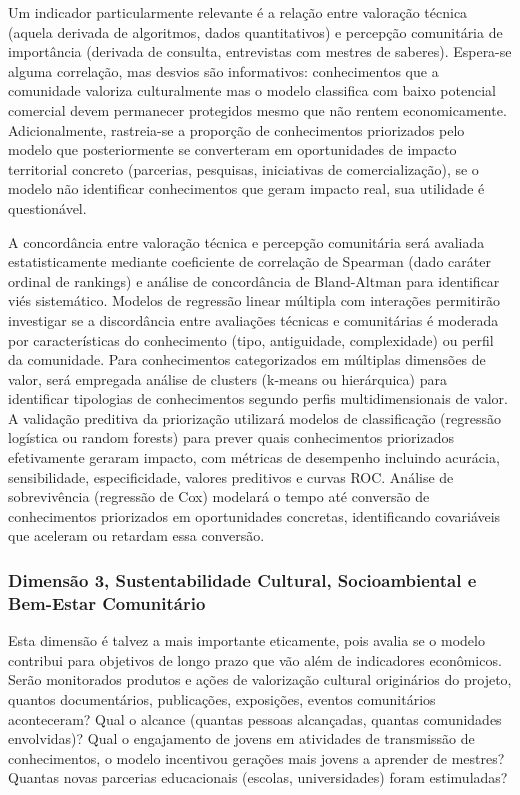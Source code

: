 Um indicador particularmente relevante é a relação entre valoração técnica (aquela derivada de algoritmos, dados quantitativos) e percepção comunitária de importância (derivada de consulta, entrevistas com mestres de saberes). Espera-se alguma correlação, mas desvios são informativos: conhecimentos que a comunidade valoriza culturalmente mas o modelo classifica com baixo potencial comercial devem permanecer protegidos mesmo que não rentem economicamente. Adicionalmente, rastreia-se a proporção de conhecimentos priorizados pelo modelo que posteriormente se converteram em oportunidades de impacto territorial concreto (parcerias, pesquisas, iniciativas de comercialização), se o modelo não identificar conhecimentos que geram impacto real, sua utilidade é questionável.

A concordância entre valoração técnica e percepção comunitária será avaliada estatisticamente mediante coeficiente de correlação de Spearman (dado caráter ordinal de rankings) e análise de concordância de Bland-Altman para identificar viés sistemático. Modelos de regressão linear múltipla com interações permitirão investigar se a discordância entre avaliações técnicas e comunitárias é moderada por características do conhecimento (tipo, antiguidade, complexidade) ou perfil da comunidade. Para conhecimentos categorizados em múltiplas dimensões de valor, será empregada análise de clusters (k-means ou hierárquica) para identificar tipologias de conhecimentos segundo perfis multidimensionais de valor. A validação preditiva da priorização utilizará modelos de classificação (regressão logística ou random forests) para prever quais conhecimentos priorizados efetivamente geraram impacto, com métricas de desempenho incluindo acurácia, sensibilidade, especificidade, valores preditivos e curvas ROC. Análise de sobrevivência (regressão de Cox) modelará o tempo até conversão de conhecimentos priorizados em oportunidades concretas, identificando covariáveis que aceleram ou retardam essa conversão.

\subsubsection{Dimensão 3, Sustentabilidade Cultural, Socioambiental e Bem-Estar Comunitário}

Esta dimensão é talvez a mais importante eticamente, pois avalia se o modelo contribui para objetivos de longo prazo que vão além de indicadores econômicos. Serão monitorados produtos e ações de valorização cultural originários do projeto, quantos documentários, publicações, exposições, eventos comunitários aconteceram? Qual o alcance (quantas pessoas alcançadas, quantas comunidades envolvidas)? Qual o engajamento de jovens em atividades de transmissão de conhecimentos, o modelo incentivou gerações mais jovens a aprender de mestres? Quantas novas parcerias educacionais (escolas, universidades) foram estimuladas?


